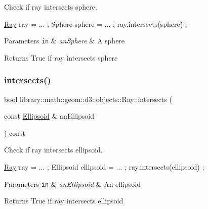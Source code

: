 Check if ray intersects sphere. 


\begin{DoxyCode}
\hyperlink{classlibrary_1_1math_1_1geom_1_1d3_1_1objects_1_1_ray_a11b7613464daaebc6e25a758b057f203}{Ray} ray = ... ;
Sphere sphere = ... ;
ray.intersects(sphere) ;
\end{DoxyCode}



\begin{DoxyParams}[1]{Parameters}
\mbox{\tt in}  & {\em an\+Sphere} & A sphere \\
\hline
\end{DoxyParams}
\begin{DoxyReturn}{Returns}
True if ray intersects sphere 
\end{DoxyReturn}
\mbox{\label{classlibrary_1_1math_1_1geom_1_1d3_1_1objects_1_1_ray_a691d9fda5c22f8cef0b412b9173fe71b}} 
\subsubsection{\texorpdfstring{intersects()}{intersects()}\hspace{0.1cm}{\footnotesize\ttfamily [4/4]}}
{\footnotesize\ttfamily bool library\+::math\+::geom\+::d3\+::objects\+::\+Ray\+::intersects (\begin{DoxyParamCaption}\item[{const \hyperlink{classlibrary_1_1math_1_1geom_1_1d3_1_1objects_1_1_ellipsoid}{Ellipsoid} \&}]{an\+Ellipsoid }\end{DoxyParamCaption}) const}



Check if ray intersects ellipsoid. 


\begin{DoxyCode}
\hyperlink{classlibrary_1_1math_1_1geom_1_1d3_1_1objects_1_1_ray_a11b7613464daaebc6e25a758b057f203}{Ray} ray = ... ;
Ellipsoid ellipsoid = ... ;
ray.intersects(ellipsoid) ;
\end{DoxyCode}



\begin{DoxyParams}[1]{Parameters}
\mbox{\tt in}  & {\em an\+Ellipsoid} & An ellipsoid \\
\hline
\end{DoxyParams}
\begin{DoxyReturn}{Returns}
True if ray intersects ellipsoid 
\end{DoxyReturn}
\mbox{\label{classlibrary_1_1math_1_1geom_1_1d3_1_1objects_1_1_ray_a7329f77a549a02e9c27d07c11adcc8bf}} 
